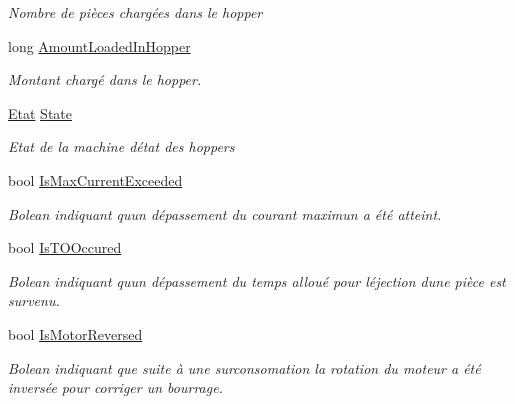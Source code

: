 \begin{DoxyCompactItemize}
\begin{DoxyCompactList}\small\item\em Nombre de pièces chargées dans le hopper \end{DoxyCompactList}\item 
long \mbox{\hyperlink{class_device_library_1_1_c_hopper_a9a68e629bcbc3cfc2c6828516e2a152d}{Amount\+Loaded\+In\+Hopper}}
\begin{DoxyCompactList}\small\item\em Montant chargé dans le hopper. \end{DoxyCompactList}\item 
\mbox{\hyperlink{class_device_library_1_1_c_hopper_a5f54d84c3b2a93420c8ff69b1351c77a}{Etat}} \mbox{\hyperlink{class_device_library_1_1_c_hopper_aa9f1e8689d187df5894527e7c02dc875}{State}}
\begin{DoxyCompactList}\small\item\em Etat de la machine d\textquotesingle{}état des hoppers \end{DoxyCompactList}\item 
bool \mbox{\hyperlink{class_device_library_1_1_c_hopper_a045b85a17c558f578649aca5d387561b}{Is\+Max\+Current\+Exceeded}}
\begin{DoxyCompactList}\small\item\em Bolean indiquant qu\textquotesingle{}un dépassement du courant maximun a été atteint. \end{DoxyCompactList}\item 
bool \mbox{\hyperlink{class_device_library_1_1_c_hopper_adf2e0f18bd630e28e89aea2f45ef6a19}{Is\+T\+O\+Occured}}
\begin{DoxyCompactList}\small\item\em Bolean indiquant qu\textquotesingle{}un dépassement du temps alloué pour l\textquotesingle{}éjection d\textquotesingle{}une pièce est survenu. \end{DoxyCompactList}\item 
bool \mbox{\hyperlink{class_device_library_1_1_c_hopper_a9e9bbbee8c2ec524e36442a66482d41f}{Is\+Motor\+Reversed}}
\begin{DoxyCompactList}\small\item\em Bolean indiquant que suite à une surconsomation la rotation du moteur a été inversée pour corriger un bourrage. \end{DoxyCompactList}\item 

\end{DoxyCompactItemize}
